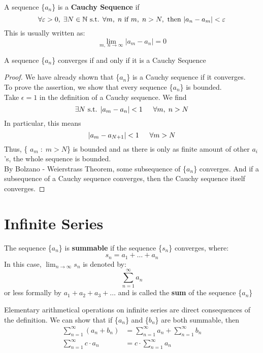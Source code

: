 \begin{definition}
    A sequence \{$a_n$\} is a \textbf{Cauchy Sequence} if 
    $$ \forall \varepsilon > 0, \; \exists N \in \mathbb{N} \text{ s.t. } \forall m, \; n \text{ if } m, \; n > N, \text{ then } |a_n - a_m| < \varepsilon$$
    This is usually written as:
    $$\lim_{m, \; n \to \infty} |a_m - a_n| = 0$$
 \end{definition}
\begin{theorem}
    A sequence \{$a_n$\} converges if and only if it is a Cauchy Sequence
\end{theorem}
\begin{proof}
    We have already shown that \{$a_n$\} is a Cauchy sequence if it converges. \\
    To prove the assertion, we show that every sequence \{$a_n$\} is bounded.\\
    Take $\epsilon = 1$ in the definition of a Cauchy sequence. We find 
    $$ \exists N \text{ s.t. } |a_m - a_n| < 1 \indent \forall m, \; n > N$$
    In particular, this means
    $$ |a_m - a_{N+1}| <1 \indent \forall m > N$$
    Thus, \{ $a_m \; : \; m>N$\} is bounded and as there is only as finite amount of other $a_i$'s, the whole sequence is bounded. \\
    By Bolzano - Weierstrass Theorem, some subsequence of \{$a_n$\} converges.
    And if a subsequence of a Cauchy sequence converges, then the Cauchy sequence itself converges.
\end{proof}
\newpage

\section{Infinite Series}
\begin{definition}
    The sequence \{$a_n$\} is \textbf{summable} if the sequence \{$s_n$\} converges, where:
    $$s_n = a_1 + \dots + a_n $$
    In this case, $ \lim_{n \to \infty}s_n $ is denoted by:
    $$\sum _{n = 1} ^{\infty}a_n$$
    or less formally by $a_1 + a_2 + a_3 + \dots$
    and is called the \textbf{sum} of the sequence \{$a_n$\}
\end{definition} \bigskip

Elementary arithmetical operations on infinite series are direct consequences of the definition. We can show that if \{$a_n$\} and \{$b_n$\} are both summable, then
\begin{align*}
   \sum _{n = 1} ^ \infty ( a_n + b_n) &= \sum _{n = 1} ^ \infty a_n + \sum _{n = 1} ^ \infty b_n \\
\sum _{n = 1} ^ \infty c \cdot a_n &= c \cdot \sum _{n = 1} ^ \infty a_n 
\end{align*}

